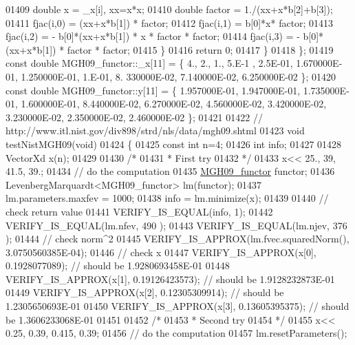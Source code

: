 \begin{DoxyCode}
01409             \textcolor{keywordtype}{double} x = \_x[i], xx=x*x;
01410             \textcolor{keywordtype}{double} factor = 1./(xx+x*b[2]+b[3]);
01411             fjac(i,0) = (xx+x*b[1]) * factor;
01412             fjac(i,1) = b[0]*x* factor;
01413             fjac(i,2) = - b[0]*(xx+x*b[1]) * x * factor * factor;
01414             fjac(i,3) = - b[0]*(xx+x*b[1]) * factor * factor;
01415         \}
01416         \textcolor{keywordflow}{return} 0;
01417     \}
01418 \};
01419 \textcolor{keyword}{const} \textcolor{keywordtype}{double} MGH09\_functor::\_x[11] = \{ 4., 2., 1., 5.E-1 , 2.5E-01, 1.670000E-01, 1.250000E-01,  1.E-01, 8.
      330000E-02, 7.140000E-02, 6.250000E-02 \};
01420 \textcolor{keyword}{const} \textcolor{keywordtype}{double} MGH09\_functor::y[11] = \{ 1.957000E-01, 1.947000E-01, 1.735000E-01, 1.600000E-01, 8.440000E-02,
       6.270000E-02, 4.560000E-02, 3.420000E-02, 3.230000E-02, 2.350000E-02, 2.460000E-02 \};
01421 
01422 \textcolor{comment}{// http://www.itl.nist.gov/div898/strd/nls/data/mgh09.shtml}
01423 \textcolor{keywordtype}{void} testNistMGH09(\textcolor{keywordtype}{void})
01424 \{
01425   \textcolor{keyword}{const} \textcolor{keywordtype}{int} n=4;
01426   \textcolor{keywordtype}{int} info;
01427 
01428   VectorXd x(n);
01429 
01430   \textcolor{comment}{/*}
01431 \textcolor{comment}{   * First try}
01432 \textcolor{comment}{   */}
01433   x<< 25., 39, 41.5, 39.;
01434   \textcolor{comment}{// do the computation}
01435   \hyperlink{struct_m_g_h09__functor}{MGH09\_functor} functor;
01436   LevenbergMarquardt<MGH09\_functor> lm(functor);
01437   lm.parameters.maxfev = 1000;
01438   info = lm.minimize(x);
01439 
01440   \textcolor{comment}{// check return value}
01441   VERIFY\_IS\_EQUAL(info, 1); 
01442   VERIFY\_IS\_EQUAL(lm.nfev, 490 ); 
01443   VERIFY\_IS\_EQUAL(lm.njev, 376 ); 
01444   \textcolor{comment}{// check norm^2}
01445   VERIFY\_IS\_APPROX(lm.fvec.squaredNorm(), 3.0750560385E-04);
01446   \textcolor{comment}{// check x}
01447   VERIFY\_IS\_APPROX(x[0], 0.1928077089); \textcolor{comment}{// should be 1.9280693458E-01}
01448   VERIFY\_IS\_APPROX(x[1], 0.19126423573); \textcolor{comment}{// should be 1.9128232873E-01}
01449   VERIFY\_IS\_APPROX(x[2], 0.12305309914); \textcolor{comment}{// should be 1.2305650693E-01}
01450   VERIFY\_IS\_APPROX(x[3], 0.13605395375); \textcolor{comment}{// should be 1.3606233068E-01}
01451 
01452   \textcolor{comment}{/*}
01453 \textcolor{comment}{   * Second try}
01454 \textcolor{comment}{   */}
01455   x<< 0.25, 0.39, 0.415, 0.39;
01456   \textcolor{comment}{// do the computation}
01457   lm.resetParameters();

\end{DoxyCode}
